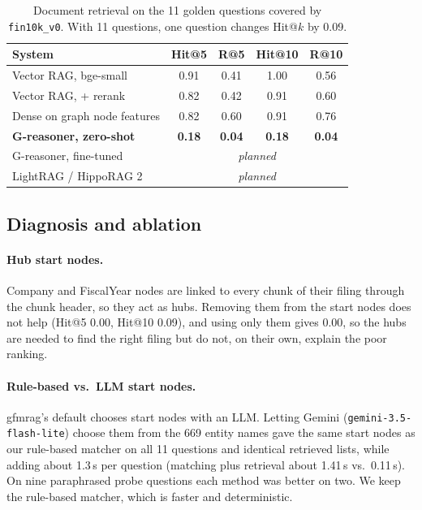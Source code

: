 \documentclass[10pt,twocolumn,letterpaper]{article}
\begin{document}
\begin{table}[t]
  \centering
  \footnotesize
  \setlength{\tabcolsep}{4pt}
  \begin{tabular}{@{}lcccc@{}}
    \toprule
    System & Hit@5 & R@5 & Hit@10 & R@10 \\
    \midrule
    Vector RAG, bge-small        & 0.91 & 0.41 & 1.00 & 0.56 \\
    Vector RAG, + rerank         & 0.82 & 0.42 & 0.91 & 0.60 \\
    Dense on graph node features & 0.82 & 0.60 & 0.91 & 0.76 \\
    \textbf{G-reasoner, zero-shot} & \textbf{0.18} & \textbf{0.04} & \textbf{0.18} & \textbf{0.04} \\
    G-reasoner, fine-tuned           & \multicolumn{4}{c}{\emph{planned}} \\
    LightRAG / HippoRAG 2            & \multicolumn{4}{c}{\emph{planned}} \\
    \bottomrule
  \end{tabular}
  \caption{Document retrieval on the 11 golden questions covered by \texttt{fin10k\_v0}. With 11
  questions, one question changes Hit@$k$ by 0.09.}
  \label{tab:greasoner}
\end{table}

\subsection{Diagnosis and ablation}
\label{sec:exp-ablation}
\paragraph{Hub start nodes.}
Company and FiscalYear nodes are linked to every chunk of their filing through the chunk header, so
they act as hubs. Removing them from the start nodes does not help (Hit@5 0.00, Hit@10 0.09), and
using only them gives 0.00, so the hubs are needed to find the right filing but do not, on their own,
explain the poor ranking.

\paragraph{Rule-based vs.\ LLM start nodes.}
gfmrag's default chooses start nodes with an LLM. Letting Gemini (\texttt{gemini-3.5-flash-lite})
choose them from the 669 entity names gave the same start nodes as our rule-based matcher on all
11 questions and identical retrieved lists, while adding about 1.3\,s per question (matching plus
retrieval about 1.41\,s vs.\ 0.11\,s). On nine paraphrased probe questions each method was better on
two. We keep the rule-based matcher, which is faster and deterministic.
\end{document}
